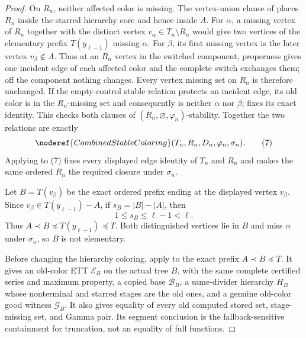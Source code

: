 \begin{proof}
On $R_n$, neither affected color is missing.  The vertex-union clause of
 places $R_n$ inside the starred hierarchy core
and hence inside $A$.  For $\alpha$, a missing vertex of $R_n$ together with the distinct vertex
$v_\alpha\in T_n\setminus R_n$ would give two vertices of the elementary
prefix $T(y_{\ell-1})$ missing $\alpha$.  For $\beta$, its first missing vertex is the later
vertex $v_\beta\notin A$.  Thus at an $R_n$ vertex in the switched
component, properness gives one incident edge of each affected color and
the complete switch exchanges them; off the component nothing changes.
Every vertex missing set on $R_n$ is therefore unchanged.  If the
empty-control stable relation protects an incident edge, its old color is
in the $R_n$-missing set and consequently is neither $\alpha$ nor $\beta$;
 fixes its exact identity.  This checks both
clauses of $(R_n,\varnothing,\varphi_n)$-stability.  Together the two
relations are exactly
\[
 \noderef{CombinedStableColoring}(T_n,R_n,D_n,\varphi_n,\sigma_n).
                                                                  \tag{7}
\]
Applying  to (7) fixes every
displayed edge identity of $T_n$ and $R_n$ and makes the same ordered
$R_n$ the required closure under $\sigma_n$.

Let $B=T(v_\beta)$ be the exact ordered prefix ending at the displayed
vertex $v_\beta$.  Since $v_\beta\in T(y_{\ell-1})-A$, if
$s_B=|B|-|A|$, then
\[
                       1\leq s_B\leq\ell-1<\ell.                \tag{8}
\]
Thus $A\prec B\preccurlyeq T(y_{\ell-1})\preccurlyeq T$.  Both
distinguished vertices lie in $B$ and miss $\alpha$ under $\sigma_n$, so
$B$ is not elementary.

Before changing the hierarchy coloring, apply
 to the exact prefix
$A\prec B\preccurlyeq T$.  It gives an old-color ETT $\mathcal E_B$ on
the actual tree $B$, with the same complete certified series and maximum
property, a copied base $\mathcal B_B$, a same-divider hierarchy $H_B$
whose nonterminal and starred stages are the old ones, and a genuine
old-color good witness $\mathcal G_B$.  It also gives equality of every old
computed stored set, stage-missing set, and Gamma pair.  Its segment
conclusion is the fallback-sensitive containment for truncation, not an
equality of full  functions.


\end{proof}
